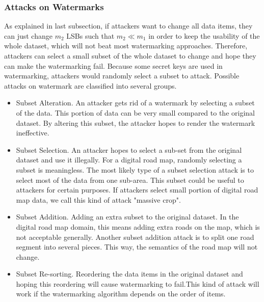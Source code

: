 \subsubsection{Attacks on Watermarks}
As explained in last subsection, if attackers want to change
all data items, they can just change ${m}_{2}$ LSBs such that
${m}_{2}\ll {m}_{1}$ in order to keep the usability of the whole
dataset, which will not beat most watermarking approaches.
Therefore, attackers can select a small subset of the whole
dataset to change and hope they can make the watermarking fail. 
Because some secret keys are used in watermarking,
attackers would randomly select a subset to attack. Possible
attacks on watermark are classified into several groups\cite{DBLP:conf/sigmod/SionAP03}.

\begin{itemize}

\item Subset Alteration.
An attacker gets rid of a watermark by selecting a subset of the data. 
This portion of data can be very small compared to the original dataset. By 
altering this subset, the attacker hopes to render the watermark ineffective.
\item Subset Selection.
	An attacker hopes to select a sub-set from the original dataset and 
use it illegally. For a digital road map, randomly selecting a subset is 
meaningless. The most likely type of a subset selection attack is to select 
most of the data from one sub-area. This subset could be useful to attackers 
for certain purposes. If attackers select small portion of digital
road map data, we call this kind of attack "massive crop".

\item Subset Addition.
Adding an extra subset to the original dataset. In the digital road map 
domain, this means adding extra roads on the map, which is not
acceptable generally. Another subset addition attack is to split one road segment into 
several pieces. This way, the semantics of the road map will not change.

\item Subset Re-sorting.
Reordering the data items in the
original dataset and hoping this reordering will cause
watermarking to fail.This kind of attack will work if the 
watermarking algorithm depends on the order of items.
\end{itemize}

